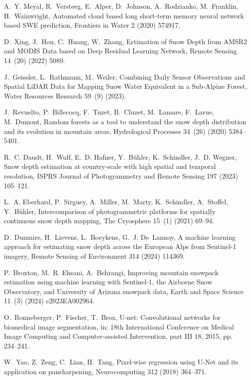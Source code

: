 \documentclass[preprint,12pt]{elsarticle}
\begin{document}
A.~Y. Meyal, R.~Versteeg, E.~Alper, D.~Johnson, A.~Rodzianko, M.~Franklin, H.~Wainwright, {Automated cloud based long short-term memory neural network based SWE prediction}, Frontiers in Water 2 (2020) 574917.

D.~Xing, J.~Hou, C.~Huang, W.~Zhang, {Estimation of Snow Depth from AMSR2 and MODIS Data based on Deep Residual Learning Network}, Remote Sensing 14~(20) (2022) 5089.

J.~Geissler, L.~Rathmann, M.~Weiler, {Combining Daily Sensor Observations and Spatial LiDAR Data for Mapping Snow Water Equivalent in a Sub‐Alpine Forest}, Water Resources Research 59~(9) (2023).

J.~Revuelto, P.~Billecocq, F.~Tuzet, B.~Cluzet, M.~Lamare, F.~Larue, M.~Dumont, Random forests as a tool to understand the snow depth distribution and its evolution in mountain areas, Hydrological Processes 34~(26) (2020) 5384--5401.

R.~C. Daudt, H.~Wulf, E.~D. Hafner, Y.~Bühler, K.~Schindler, J.~D. Wegner, Snow depth estimation at country-scale with high spatial and temporal resolution, ISPRS Journal of Photogrammetry and Remote Sensing 197 (2023) 105--121.

L.~A. Eberhard, P.~Sirguey, A.~Miller, M.~Marty, K.~Schindler, A.~Stoffel, Y.~Bühler, Intercomparison of photogrammetric platforms for spatially continuous snow depth mapping, The Cryosphere 15~(1) (2021) 69--94.

D.~Dunmire, H.~Lievens, L.~Boeykens, G.~J. De~Lannoy, {A machine learning approach for estimating snow depth across the European Alps from Sentinel-1 imagery}, Remote Sensing of Environment 314 (2024) 114369.

P.~Broxton, M.~R. Ehsani, A.~Behrangi, {Improving mountain snowpack estimation using machine learning with Sentinel-1, the Airborne Snow Observatory, and University of Arizona snowpack data}, Earth and Space Science 11~(3) (2024) e2023EA002964.

O.~Ronneberger, P.~Fischer, T.~Brox, {U-net: Convolutional networks for biomedical image segmentation}, in: 18th International Conference on Medical Image Computing and Computer-assisted Intervention, part III 18, 2015, pp. 234--241.

W.~Yao, Z.~Zeng, C.~Lian, H.~Tang, {Pixel-wise regression using U-Net and its application on pansharpening}, Neurocomputing 312 (2018) 364--371.
\end{document}
